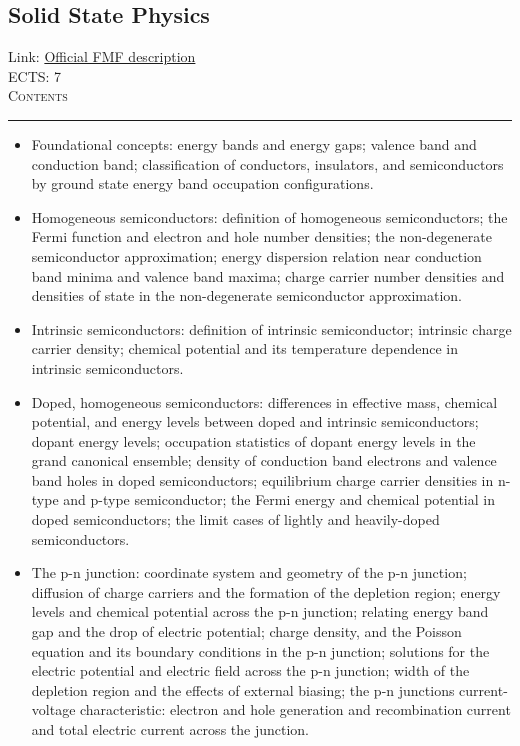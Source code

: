 \documentclass[11pt, a4paper]{article}
\newenvironment{course}[3]{
\subsection{#1}%
Link: \href{#2}{Official FMF description}\\%
ECTS: #3%
\vspace{1ex}
\\
{\large \textsc{Contents}}\\[-0.9ex]%
\rule{\textwidth}{0.5pt}
\vspace{-3ex}
}
{}
\newenvironment{chapter}[1]{
\begin{tcolorbox}[title=#1, breakable]
}
{\end{tcolorbox}}
\begin{document}
\begin{course}{Solid State Physics}{https://www.fmf.uni-lj.si/en/study-physics/programmes/1fiz/2020/7000777/courses/1138/}{7}
\begin{chapter}{Semiconductor physics}
\begin{itemize}
            \item Foundational concepts: energy bands and energy gaps; valence band and conduction band; classification of conductors, insulators, and semiconductors by ground state energy band occupation configurations.

            \item Homogeneous semiconductors: definition of homogeneous semiconductors; the Fermi function and electron and hole number densities; the non-degenerate semiconductor approximation; energy dispersion relation near conduction band minima and valence band maxima; charge carrier number densities and densities of state in the non-degenerate semiconductor approximation.

            \item Intrinsic semiconductors: definition of intrinsic semiconductor; intrinsic charge carrier density; chemical potential and its temperature dependence in intrinsic semiconductors.

            \item Doped, homogeneous semiconductors: differences in effective mass, chemical potential, and energy levels between doped and intrinsic semiconductors; dopant energy levels; occupation statistics of dopant energy levels in the grand canonical ensemble; density of conduction band electrons and valence band holes in doped semiconductors; equilibrium charge carrier densities in n-type and p-type semiconductor; the Fermi energy and chemical potential in doped semiconductors; the limit cases of lightly and heavily-doped semiconductors.

            \item The p-n junction: coordinate system and geometry of the p-n junction; diffusion of charge carriers and the formation of the depletion region; energy levels and chemical potential across the p-n junction; relating energy band gap and the drop of electric potential; charge density, and the Poisson equation and its boundary conditions in the p-n junction; solutions for the electric potential and electric field across the p-n junction; width of the depletion region and the effects of external biasing;
            the p-n junctions current-voltage characteristic: electron and hole generation and recombination current and total electric current across the junction.
        
        \end{itemize}
    \end{chapter}


\end{course}
\end{document}
